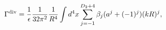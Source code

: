 \begin{equation}
    \label{sdiv}
    \Gamma^{\rm div}=
    {1\over\epsilon} {1 \over 32 \pi^2} {1\over R^4}
    \int d^4x \sum_{j=-1}^{D_2+4} \beta_j (a^j
    +(-1)^j)(kR)^j ,
\end{equation}

